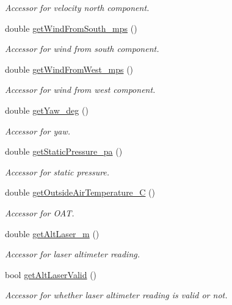 \begin{DoxyCompactItemize}
\begin{DoxyCompactList}\small\item\em Accessor for velocity north component. \end{DoxyCompactList}\item 
double \hyperlink{class_piccolo_telemetry_belief_abf669b99f1d137870ca418d03121801e}{getWindFromSouth\_\-mps} ()
\begin{DoxyCompactList}\small\item\em Accessor for wind from south component. \end{DoxyCompactList}\item 
double \hyperlink{class_piccolo_telemetry_belief_a2ff4382f656f12e1a7bdec51af4bbd93}{getWindFromWest\_\-mps} ()
\begin{DoxyCompactList}\small\item\em Accessor for wind from west component. \end{DoxyCompactList}\item 
double \hyperlink{class_piccolo_telemetry_belief_a662f8a0adf70dd55a9db133ee23759fc}{getYaw\_\-deg} ()
\begin{DoxyCompactList}\small\item\em Accessor for yaw. \end{DoxyCompactList}\item 
double \hyperlink{class_piccolo_telemetry_belief_a98c6fdd8a68bbb750758ff1cb1bb6f74}{getStaticPressure\_\-pa} ()
\begin{DoxyCompactList}\small\item\em Accessor for static pressure. \end{DoxyCompactList}\item 
double \hyperlink{class_piccolo_telemetry_belief_a98d3aaca093a3fbdd633227b7f4df4dc}{getOutsideAirTemperature\_\-C} ()
\begin{DoxyCompactList}\small\item\em Accessor for OAT. \end{DoxyCompactList}\item 
double \hyperlink{class_piccolo_telemetry_belief_a9829aeb648adce4bd9a90dfe24023d9e}{getAltLaser\_\-m} ()
\begin{DoxyCompactList}\small\item\em Accessor for laser altimeter reading. \end{DoxyCompactList}\item 
bool \hyperlink{class_piccolo_telemetry_belief_ac4e7a21e2b2308448e7b415b198c7f75}{getAltLaserValid} ()
\begin{DoxyCompactList}\small\item\em Accessor for whether laser altimeter reading is valid or not. \end{DoxyCompactList}\item 

\end{DoxyCompactItemize}
